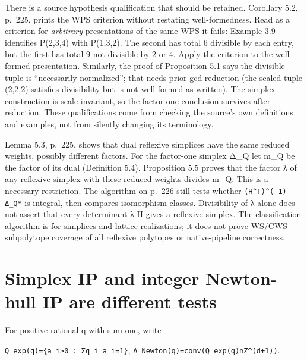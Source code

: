 \documentclass[11pt,a4paper,oneside]{report}
\begin{document}
There is a source hypothesis qualification that should be retained.
Corollary 5.2, p.~225, prints the WPS criterion without restating
well-formedness. Read as a criterion for \emph{arbitrary} presentations
of the same WPS it fails: Example 3.9 identifies P(2,3,4) with P(1,3,2).
The second has total 6 divisible by each entry, but the first has total
9 not divisible by 2 or 4. Apply the criterion to the well-formed
presentation. Similarly, the proof of Proposition 5.1 says the divisible
tuple is ``necessarily normalized''; that needs prior gcd reduction (the
scaled tuple (2,2,2) satisfies divisibility but is not well formed as
written). The simplex construction is scale invariant, so the factor-one
conclusion survives after reduction. These qualifications come from
checking the source's own definitions and examples, not from silently
changing its terminology.

Lemma 5.3, p.~225, shows that dual reflexive simplices have the same
reduced weights, possibly different factors. For the factor-one simplex
Δ\_Q let m\_Q be the factor of its dual (Definition 5.4). Proposition
5.5 proves that the factor λ of any reflexive simplex with these reduced
weights divides m\_Q. This is a necessary restriction. The algorithm on
p.~226 still tests whether
\texttt{(\allowbreak{}H\textasciicircum{}T)\allowbreak{}\textasciicircum{}(\allowbreak{}-\allowbreak{}1)\allowbreak{} Δ\_\allowbreak{}Q*}
is integral, then compares isomorphism classes. Divisibility of λ alone
does not assert that every determinant-λ H gives a reflexive simplex.
The classification algorithm is for simplices and lattice realizations;
it does not prove WS/CWS subpolytope coverage of all reflexive polytopes
or native-pipeline correctness.

\section{Simplex IP and integer Newton-hull IP are different
tests}\label{weight-systems-and-wps--simplex-ip-and-integer-newton-hull-ip-are-different-tests}

For positive rational q with sum one, write

\texttt{Q\_\allowbreak{}exp(\allowbreak{}q)\allowbreak{}=\allowbreak{}\{a\_\allowbreak{}i≥0 :\allowbreak{} Σq\_\allowbreak{}i a\_\allowbreak{}i=\allowbreak{}1\}},
\texttt{Δ\_\allowbreak{}Newton(\allowbreak{}q)\allowbreak{}=\allowbreak{}conv(\allowbreak{}Q\_\allowbreak{}exp(\allowbreak{}q)\allowbreak{}∩Z\textasciicircum{}(\allowbreak{}d+1)\allowbreak{})}.
\end{document}
